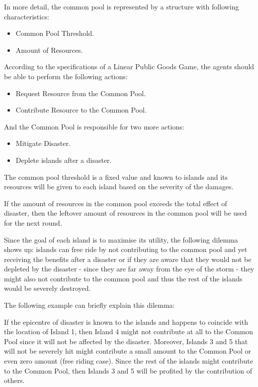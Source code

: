 In more detail, the common pool is represented by a structure with following characteristics:

\begin{itemize}
    \item Common Pool Threshold.
    \item Amount of Resources.
\end{itemize}

According to the specifications of a Linear Public Goods Game, the agents should be able to perform the following actions:  

\begin{itemize}
    \item Request Resource from the Common Pool.
    \item Contribute Resource to the Common Pool. 
\end{itemize}

And the Common Pool is responsible for two more actions: 

\begin{itemize}
    \item Mitigate Disaster.
    \item Deplete islands after a disaster.
\end{itemize}

The common pool threshold is a fixed value and known to islands and its resources will be given to each island based on the severity of the damages.

If the amount of resources in the common pool exceeds the total effect of disaster, then the leftover amount of resources in the common pool will be used for the next round.

Since the goal of each island is to maximise its utility, the following dilemma shows up: islands can free ride by not contributing to the common pool and yet receiving the benefits after a disaster or if they are aware that they would not be depleted by the disaster - since they are far away from the eye of the storm - they might also not contribute to the common pool and thus the rest of the islands would be severely destroyed.

The following example can briefly explain this dilemma:

If the epicentre of disaster is known to the islands and happens to coincide with the location of Island 1, then Island 4 might not contribute at all to the Common Pool since it will not be affected by the disaster. Moreover, Islands 3 and 5 that will not be severely hit might contribute a small amount to the Common Pool or even zero amount (free riding case). Since the rest of the islands might contribute to the Common Pool, then Islands 3 and 5 will be profited by the contribution of others.

